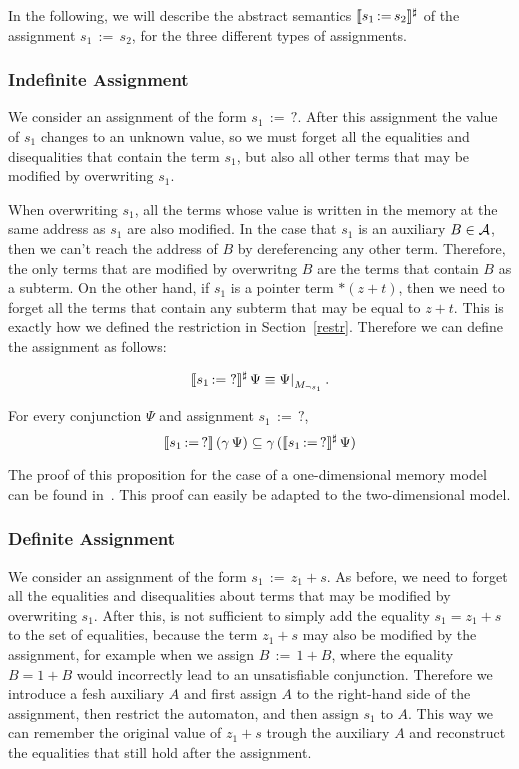 In the following, we will describe the abstract semantics $\llbracket s_1\,{:=}\,s_2\rrbracket^\sharp$ of the assignment $s_1\,{:=}\,s_2$, for the three different types of assignments.

\subsubsection{Indefinite Assignment}

We consider an assignment of the form $s_1\,{:=}\,?$.
After this assignment the value of $s_1$ changes to an unknown value, so we must forget all the equalities and disequalities that contain the term $s_1$, but also all other terms that may be modified by overwriting $s_1$.

When overwriting $s_1$, all the terms whose value is written in the memory at the same address as $s_1$ are also modified.
In the case that $s_1$ is an auxiliary $B \in \mathcal{A}$, then we can't reach the address of $B$ by dereferencing any other term.
Therefore, the only terms that are modified by overwritng $B$ are the terms that contain $B$ as a subterm.
On the other hand, if $s_1$ is a pointer term $*(z+t)$, then we need to forget all the terms that contain any subterm that may be equal to $z+t$.
This is exactly how we defined the restriction in Section~\ref{restr}.
Therefore we can define the assignment as follows:

\[
	\sem{s_1\,{:=}\;?}^\sharp\,\Psi \equiv \restr{\Psi}{M_{\neg s_1}}.
\]

\begin{proposition}\label{p:ass-unknown}
	For every conjunction $\Psi$ and assignment $s_1\,{:=}\,?$,
	\[
		\llbracket s_1\,{:=}\,?\rrbracket\,(\gamma\,\Psi) \subseteq \gamma\,(\llbracket s_1\,{:=}\,?\rrbracket^\sharp\,\Psi)
	\]
\end{proposition}

The proof of this proposition for the case of a one-dimensional memory model can be found in~\cite{2pointer}.
This proof can easily be adapted to the two-dimensional model.

\subsubsection{Definite Assignment}

We consider an assignment of the form $s_1\,{:=}\,z_1+s$.
As before, we need to forget all the equalities and disequalities about terms that may be modified by overwriting $s_1$.
After this, is not sufficient to simply add the equality $s_1 = z_1+s$ to the set of equalities, because the term $z_1 + s$ may also be modified by the assignment, for example when we assign $B\,{:=}\,1+B$, where the equality $B = 1 + B$ would incorrectly lead to an unsatisfiable conjunction.
Therefore we introduce a fesh auxiliary $A$ and first assign $A$ to the right-hand side of the assignment, then restrict the automaton, and then assign $s_1$ to $A$.
This way we can remember the original value of $z_1 + s$ trough the auxiliary $A$ and reconstruct the equalities that still hold after the assignment.

